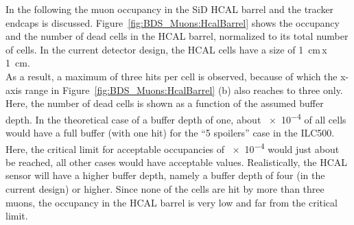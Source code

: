 In the following the muon occupancy in the SiD HCAL barrel and the tracker endcaps is discussed.
Figure~\ref{fig:BDS_Muons:HcalBarrel} shows the occupancy and the number of dead cells in the HCAL barrel, normalized to its total number of cells.
In the current detector design, the HCAL cells have a size of \SI{1}{\centi\meter}\,x\,\SI{1}{\centi\meter}.
\\As a result, a maximum of three hits per cell is observed, because of which the x-axis range in Figure~\ref{fig:BDS_Muons:HcalBarrel} (b) also reaches to three only.
Here, the number of dead cells is shown as a function of the assumed buffer depth.
In the theoretical case of a buffer depth of one, about \num{e-4} of all cells would have a full buffer (with one hit) for the ``5 spoilers'' case in the ILC500.
Here, the critical limit for acceptable occupancies of \num{e-4} would just about be reached, all other cases would have acceptable values.
Realistically, the HCAL sensor will have a higher buffer depth, namely a buffer depth of four (in the current design) or higher.
Since none of the cells are hit by more than three muons, the occupancy in the HCAL barrel is very low and far from the critical limit.
